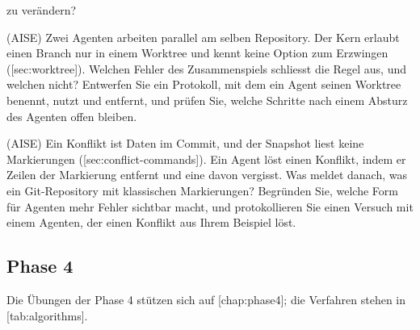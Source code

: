 zu verändern?
\item (AISE) Zwei Agenten arbeiten parallel am selben Repository.
Der Kern erlaubt einen Branch nur in einem Worktree und kennt keine Option zum Erzwingen
([sec:worktree]).
Welchen Fehler des Zusammenspiels schliesst die Regel aus, und welchen nicht?
Entwerfen Sie ein Protokoll, mit dem ein Agent seinen Worktree benennt, nutzt und entfernt,
und prüfen Sie, welche Schritte nach einem Absturz des Agenten offen bleiben.
\item (AISE) Ein Konflikt ist Daten im Commit, und der Snapshot liest keine Markierungen
([sec:conflict-commands]).
Ein Agent löst einen Konflikt, indem er Zeilen der Markierung entfernt und eine davon vergisst.
Was meldet  danach, was ein Git-Repository mit klassischen Markierungen?
Begründen Sie, welche Form für Agenten mehr Fehler sichtbar macht, und protokollieren Sie
einen Versuch mit einem Agenten, der einen Konflikt aus Ihrem Beispiel löst.
\stopitemize

\subsection{Phase 4}

Die Übungen der Phase 4 stützen sich auf [chap:phase4];
die Verfahren stehen in [tab:algorithms].

